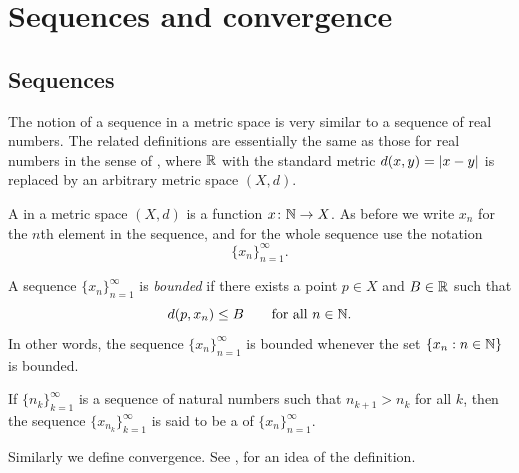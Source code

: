
\sectionnewpage
\section{Sequences and convergence}
\label{sec:metseqs}


\subsection{Sequences}

The notion of a sequence in a metric space is very similar to a sequence of
real numbers.
The related definitions are essentially the same as those for real numbers
in the sense of , where ${\mathbb{R}}$ with
the standard metric $d(x,y)=\left\lvert {x-y} \right\rvert$ is replaced
by an arbitrary metric space $(X,d)$.


\begin{defn}
A \emph{} in a metric space $(X,d)$ is a function
$x \colon {\mathbb{N}} \to X$.  As before we write $x_n$ for the $n$th element in
the sequence, and for the whole sequence use the notation
\begin{equation*}
\{ x_n \}_{n=1}^\infty .
\end{equation*}

A sequence $\{ x_n \}_{n=1}^\infty$ is \emph{bounded} if
there exists a point $p \in X$ and $B \in {\mathbb{R}}$ such that
\begin{equation*}
d(p,x_n) \leq B \qquad \text{for all } n \in {\mathbb{N}}.
\end{equation*}
In other words, the sequence $\{x_n\}_{n=1}^\infty$ is bounded whenever
the set $\{ x_n : n \in {\mathbb{N}} \}$
is bounded.

If $\{ n_k \}_{k=1}^\infty$ is a sequence of natural numbers
such that $n_{k+1} > n_k$ for all $k$, then
the sequence $\{ x_{n_k} \}_{k=1}^\infty$
is said to be
a \emph{} of $\{x_n \}_{n=1}^\infty$.
\end{defn}

Similarly we define convergence.
See , for an idea of
the definition.

